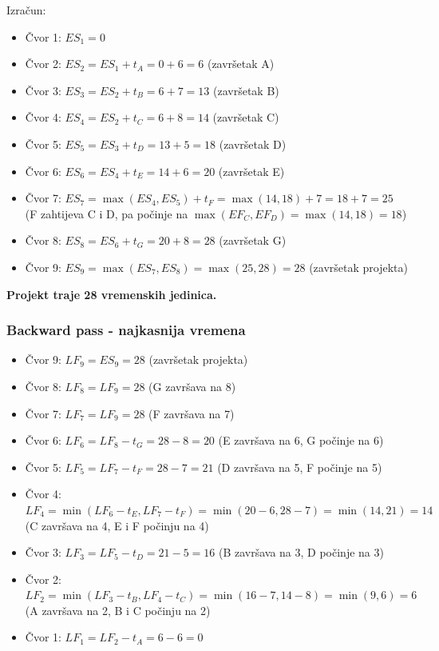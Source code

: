 \documentclass[12pt,a4paper]{article}
\begin{document}
Izračun:
\begin{itemize}
\item Čvor 1: $ES_1 = 0$
\item Čvor 2: $ES_2 = ES_1 + t_A = 0 + 6 = 6$ (završetak A)
\item Čvor 3: $ES_3 = ES_2 + t_B = 6 + 7 = 13$ (završetak B)
\item Čvor 4: $ES_4 = ES_2 + t_C = 6 + 8 = 14$ (završetak C)
\item Čvor 5: $ES_5 = ES_3 + t_D = 13 + 5 = 18$ (završetak D)
\item Čvor 6: $ES_6 = ES_4 + t_E = 14 + 6 = 20$ (završetak E)
\item Čvor 7: $ES_7 = \max(ES_4, ES_5) + t_F = \max(14, 18) + 7 = 18 + 7 = 25$ \\
      (F zahtijeva C i D, pa počinje na $\max(EF_C, EF_D) = \max(14, 18) = 18$)
\item Čvor 8: $ES_8 = ES_6 + t_G = 20 + 8 = 28$ (završetak G)
\item Čvor 9: $ES_9 = \max(ES_7, ES_8) = \max(25, 28) = 28$ (završetak projekta)
\end{itemize}

\textbf{Projekt traje 28 vremenskih jedinica.}

\subsubsection{Backward pass - najkasnija vremena}

\begin{itemize}
\item Čvor 9: $LF_9 = ES_9 = 28$ (završetak projekta)
\item Čvor 8: $LF_8 = LF_9 = 28$ (G završava na 8)
\item Čvor 7: $LF_7 = LF_9 = 28$ (F završava na 7)
\item Čvor 6: $LF_6 = LF_8 - t_G = 28 - 8 = 20$ (E završava na 6, G počinje na 6)
\item Čvor 5: $LF_5 = LF_7 - t_F = 28 - 7 = 21$ (D završava na 5, F počinje na 5)
\item Čvor 4: $LF_4 = \min(LF_6 - t_E, LF_7 - t_F) = \min(20 - 6, 28 - 7) = \min(14, 21) = 14$ \\
      (C završava na 4, E i F počinju na 4)
\item Čvor 3: $LF_3 = LF_5 - t_D = 21 - 5 = 16$ (B završava na 3, D počinje na 3)
\item Čvor 2: $LF_2 = \min(LF_3 - t_B, LF_4 - t_C) = \min(16 - 7, 14 - 8) = \min(9, 6) = 6$ \\
      (A završava na 2, B i C počinju na 2)
\item Čvor 1: $LF_1 = LF_2 - t_A = 6 - 6 = 0$
\end{itemize}
\end{document}
